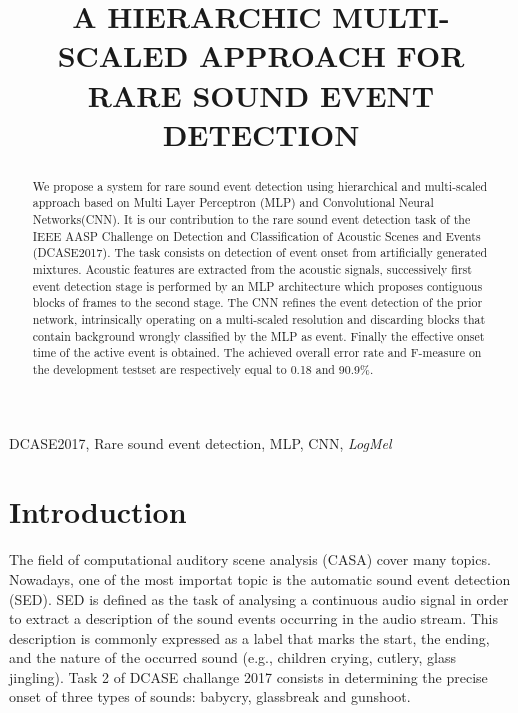 \documentclass{article}
\title{A HIERARCHIC MULTI-SCALED APPROACH FOR RARE SOUND EVENT DETECTION}
\begin{document}
\ninept
\maketitle

\begin{sloppy}

\begin{abstract}
We propose a system for rare sound event detection using hierarchical and multi-scaled approach based on Multi Layer Perceptron (MLP) and Convolutional Neural Networks(CNN). 
It is our contribution to the rare sound event detection task of the IEEE AASP Challenge on  Detection and Classification of Acoustic Scenes and Events (DCASE2017). The task consists on detection of event onset from artificially generated mixtures. Acoustic features are extracted from the acoustic signals, successively first event detection stage is performed by an MLP architecture which proposes contiguous blocks of frames to the second stage. The CNN refines the event detection of the prior network, intrinsically operating on a multi-scaled resolution and discarding blocks that contain background wrongly classified by the MLP as event. Finally the effective onset time of the active event is obtained.
The achieved overall error rate and F-measure on the development testset are respectively equal to 0.18 and 90.9\%.
\end{abstract}

\begin{keywords}
DCASE2017, Rare sound event detection, MLP, CNN, \textit{LogMel}
\end{keywords}


\section{Introduction}
\label{sec:intro}

\label{sec:format}


The field of computational auditory scene analysis (CASA) cover many topics. Nowadays, one of the most importat topic is the automatic sound event detection (SED). SED is defined as the task of analysing a continuous audio
signal in order to extract a description of the sound events
occurring in the audio stream. This description is commonly
expressed as a label that marks the start, the ending, and the
nature of the occurred sound (e.g., children crying, cutlery,
glass jingling).
Task 2 of DCASE challange 2017 \cite{dcase2017web} consists in determining the precise onset of three types of sounds: babycry, glassbreak and gunshoot. 


\end{sloppy}
\end{document}
